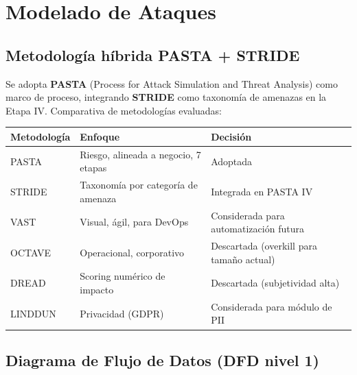 \documentclass[12pt,a4paper,oneside]{article}
\begin{document}
\section{Modelado de Ataques}

\subsection{Metodología híbrida PASTA + STRIDE}

Se adopta \textbf{PASTA} (Process for Attack Simulation and Threat Analysis) como marco de proceso, integrando \textbf{STRIDE} como taxonomía de amenazas en la Etapa IV. Comparativa de metodologías evaluadas:

\begin{table}[h]
\centering
\small
\begin{tabularx}{\textwidth}{lXl}
\toprule
\textbf{Metodología} & \textbf{Enfoque} & \textbf{Decisión} \\
\midrule
PASTA & Riesgo, alineada a negocio, 7 etapas & \textcolor{success}{Adoptada} \\
STRIDE & Taxonomía por categoría de amenaza & \textcolor{success}{Integrada en PASTA IV} \\
VAST & Visual, ágil, para DevOps & Considerada para automatización futura \\
OCTAVE & Operacional, corporativo & Descartada (overkill para tamaño actual) \\
DREAD & Scoring numérico de impacto & Descartada (subjetividad alta) \\
LINDDUN & Privacidad (GDPR) & Considerada para módulo de PII \\
\bottomrule
\end{tabularx}
\end{table}

\subsection{Diagrama de Flujo de Datos (DFD nivel 1)}
\end{document}
